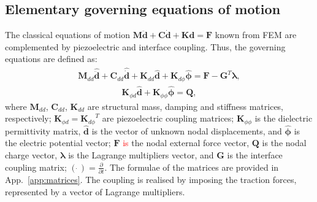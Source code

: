 \documentclass[sensors,article,submit,moreauthors,pdftex]{Definitions/mdpi}
\begin{document}
\subsection{Elementary governing equations of motion}
\label{sec:motion}
The classical equations of motion \(\textbf{M}\ddot{\textbf{d}} + \textbf{C}\dot{\textbf{d}} + \textbf{K}\textbf{d} = \textbf{F}\) known from FEM are complemented by piezoelectric and interface coupling. Thus, the governing equations are defined as:
\begin{eqnarray}
\textbf{M}_{dd} \widehat{\ddot{\textbf{d}}} + \textbf{C}_{dd} \widehat{\dot{\textbf{d}}} + \textbf{K}_{dd} \widehat{\textbf{d}} + \textbf{K}_{d\phi} \widehat{\boldsymbol{\phi}} = \textbf{F} - \textbf{G}^T \boldsymbol{\lambda},
\label{eq:motion}
\end{eqnarray}
\begin{eqnarray}
\textbf{K}_{\phi d}\widehat{\textbf{d}} + \textbf{K}_{\phi \phi} \widehat{\boldsymbol{\phi}} = \textbf{Q},
\label{eq:piezocoupling}
\end{eqnarray} 
where \(\textbf{M}_{dd}\), \(\textbf{C}_{dd}\), \(\textbf{K}_{dd}\) are structural mass, damping and stiffness matrices, respectively; \(\textbf{K}_{\phi d}={\textbf{K}_{d\phi}}^T\) are piezoelectric coupling matrices; \(\textbf{K}_{\phi \phi}\) is the dielectric permittivity matrix, \(\widehat{\textbf{d}}\) is the vector of unknown nodal displacements, and \(\widehat{\boldsymbol{\phi}}\) is the electric potential vector; \(\textbf{F}\) \textcolor{red}{is} the nodal external force vector, \(\textbf{Q}\) is the nodal charge vector, \(\boldsymbol{\lambda}\) is the Lagrange multipliers vector, and \(\textbf{G}\) is the interface coupling matrix; \((\dot{\ })=\frac{\partial}{\partial t}\).
The formulae of the matrices are provided in App.~\ref{app:matrices}.
The coupling is realised by imposing the traction forces, represented by a vector of Lagrange multipliers. 
\end{document}
